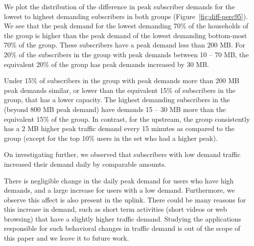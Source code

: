 We plot the distribution of the difference in peak subscriber demands for
the lowest to highest demanding subscribers in both groups (Figure~\ref{fig:diff-perc95}).
We see that the peak demand for the lowest demanding 70\% of the households of
the \treatment{} group is higher than the peak demand of the lowest demanding bottom-most
70\% of the \control{} group. These subscribers have a peak demand less than 200 MB.
For 20\% of the subscribers in the \control{} group with peak demands between 10 -- 70 MB,
the equivalent 20\% of the \treatment{} group has peak demands increased by 30 MB.

Under 15\% of subscribers in the \treatment{} group with peak demands more than 200 MB 
peak demands similar, or lower than the equivalent 15\% of subscribers in the \control{}
group, that has a lower capacity. The highest demanding subscribers in the \treatment{}
(beyond 800 MB peak demand) have demands 15 -- 30 MB more than the equivalent 15\% of 
the \control{} group. In contrast, for the upstream, the \treatment{} group consistently has
a 2 MB higher peak traffic demand every 15 minutes as compared to the \control{} group
(except for the top 10\% users in the \treatment{} set who had a higher peak).

On investigating further, we observed that subscribers with low demand traffic 
increased their demand daily by comparable amounts.

There is negligible change in the daily peak 
demand for users who have high demands, and a large increase for users with a low demand.
Furthermore, we observe this affect is also present in the uplink.
There could be many reasons for this increase in demand, such as short
term activities (short videos or web browsing) 
that have a slightly higher traffic demand. Studying the applications 
responsible for such behavioral changes in traffic demand is out of the
scope of this paper and we leave it to future work.